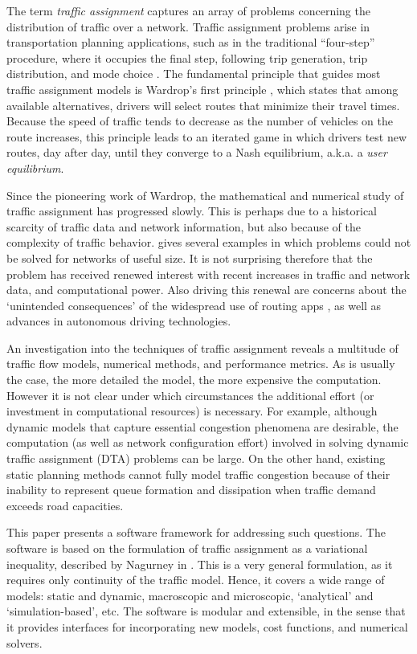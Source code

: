 The term \textit{traffic assignment} captures an array of problems concerning the distribution of traffic over a network. Traffic assignment problems arise in transportation planning applications, such as in the traditional ``four-step'' procedure, where it occupies the final step, following trip generation, trip distribution, and mode choice \cite{mcnally2007four}.  The fundamental principle that guides most traffic assignment models is Wardrop's first principle \cite{wardrop1952some}, which states that among available alternatives, drivers will select routes that minimize their travel times. Because the speed of traffic tends to decrease as the number of vehicles on the route increases, this principle leads to an iterated game in which drivers test new routes, day after day, until they converge to a Nash equilibrium, a.k.a. a \textit{user equilibrium}. 

Since the pioneering work of Wardrop, the mathematical and numerical study of traffic assignment has progressed slowly.
This is perhaps due to a historical scarcity of traffic data and network information, but also because of the complexity of traffic behavior. \cite{peeta} gives several examples in which problems could not be solved for networks of useful size. It is not surprising therefore that the problem has received renewed interest with recent increases in traffic and network data, and computational power. Also driving this renewal are concerns about the `unintended consequences' of the widespread use of routing apps \cite{traffic_apps}, as well as advances in autonomous driving technologies.

An investigation into the techniques of traffic assignment reveals a multitude of traffic flow models, numerical methods, and performance metrics. As is usually the case, the more detailed the model, the more expensive the computation. However it is not clear under which circumstances the additional effort (or investment in computational resources) is necessary. For example, although dynamic models that capture essential congestion phenomena are desirable, the computation (as well as network configuration effort) involved in solving dynamic traffic assignment (DTA) problems can be large. On the other hand, existing static planning methods cannot fully model traffic congestion because of their inability to represent queue formation and dissipation when traffic demand exceeds road capacities\cite{nie2010solving}. 

This paper presents a software framework for addressing such questions. The software is based on the formulation of traffic assignment as a variational inequality, described by Nagurney in \cite{nagurney2013network}. This is a very general formulation, as it requires only continuity of the traffic model. Hence, it covers a wide range of models: static and dynamic, macroscopic and microscopic, `analytical' and `simulation-based', etc. The software is modular and extensible, in the sense that it provides interfaces for incorporating new models, cost functions, and numerical solvers. 

